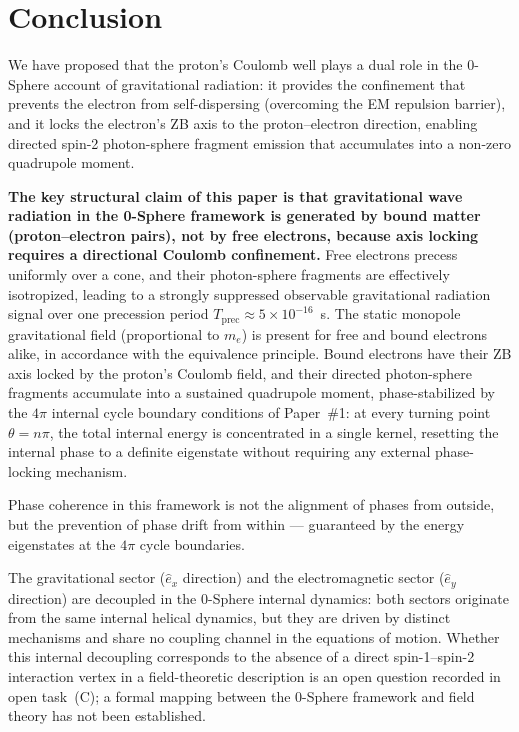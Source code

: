 \documentclass[%
 reprint, amsmath,amssymb, aps, prd, ]{revtex4-2}
\numberwithin{equation}{section}
\newcommand{\iphase}{\theta}
\begin{document}
\section{Conclusion}
\label{sec:conclusion}

We have proposed that the proton's Coulomb well plays a dual role in the 0-Sphere account of gravitational radiation: it provides the confinement that prevents the electron from self-dispersing (overcoming the EM repulsion barrier), and it locks the electron's ZB axis to the proton--electron direction, enabling directed spin-2 photon-sphere fragment emission that accumulates into a non-zero quadrupole moment.

\textbf{The key structural claim of this paper is that gravitational wave radiation in the 0-Sphere framework is generated by bound matter (proton--electron pairs), not by free electrons, because axis locking requires a directional Coulomb confinement.}
Free electrons precess uniformly over a cone, and their photon-sphere fragments are effectively isotropized, leading to a strongly suppressed observable gravitational radiation signal over one precession period $T_\mathrm{prec} \approx 5\times10^{-16}$~s.
The static monopole gravitational field (proportional to $m_e$) is present for free and bound electrons alike, in accordance with the equivalence principle.
Bound electrons have their ZB axis locked by the proton's Coulomb field, and their directed photon-sphere fragments accumulate into a sustained quadrupole moment, phase-stabilized by the $4\pi$ internal cycle boundary conditions of Paper~\#1: at every turning point $\iphase = n\pi$, the total internal energy is concentrated in a single kernel, resetting the internal phase to a definite eigenstate without requiring any external phase-locking mechanism.

Phase coherence in this framework is not the alignment of phases from outside, but the prevention of phase drift from within --- guaranteed by the energy eigenstates at the $4\pi$ cycle boundaries.

The gravitational sector ($\hat{e}_x$ direction) and the electromagnetic sector ($\hat{e}_y$ direction) are decoupled in the 0-Sphere internal dynamics: both sectors originate from the same internal helical dynamics, but they are driven by distinct mechanisms and share no coupling channel in the equations of motion.
Whether this internal decoupling corresponds to the absence of a direct spin-1--spin-2 interaction vertex in a field-theoretic description is an open question recorded in open task~(C); a formal mapping between the 0-Sphere framework and field theory has not been established.
\end{document}
